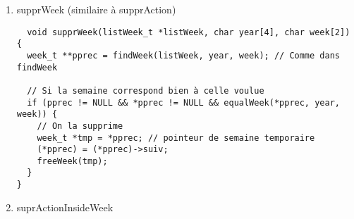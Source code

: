 \documentclass[11pt]{article}
\begin{document}
\begin{enumerate}
\begin{lstlisting}
  week_t **insertWeek(listWeek_t *listWeek, week_t *nouvWeek) {
  week_t **prec; // Comme dans findWeek

  if (nouvWeek != NULL) {
    prec = findWeek(listWeek, nouvWeek->year, nouvWeek->numWeek);

    // Si il existe déjà une liste dans ce créneau.
    if ((*prec) != NULL &&
	equalWeek((*prec), nouvWeek->year, nouvWeek->numWeek)) {

      printf("THIS WEEK ALREADY EXIST, NO NEED TO ADD IT\n");

      // On libère celle en trop.
      freeWeek(nouvWeek);

    }

    // Sinon on l'ajoute
    else {
      nouvWeek->suiv = (*prec);
      *prec = nouvWeek;
    }
  }
  return prec;
}
\end{lstlisting}


\item supprWeek (similaire à supprAction)
\label{sec:orga2e7bb6}

\begin{lstlisting}
  void supprWeek(listWeek_t *listWeek, char year[4], char week[2]) {
  week_t **pprec = findWeek(listWeek, year, week); // Comme dans findWeek

  // Si la semaine correspond bien à celle voulue
  if (pprec != NULL && *pprec != NULL && equalWeek(*pprec, year, week)) {
    // On la supprime
    week_t *tmp = *pprec; // pointeur de semaine temporaire
    (*pprec) = (*pprec)->suiv;
    freeWeek(tmp);
  }
}

\end{lstlisting}


\item suprActionInsideWeek
\label{sec:orgc0ee3d7}


\end{enumerate}
\end{document}
